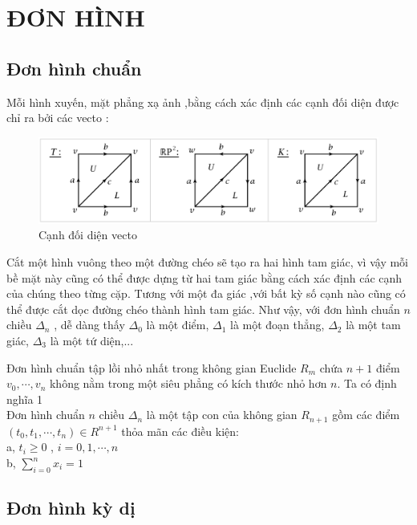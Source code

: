 \chapter{ĐƠN HÌNH}
\section{Đơn hình chuẩn}
\indent Mỗi hình xuyến, mặt phẳng xạ ảnh ,bằng cách xác định các cạnh đối diện được chỉ ra bởi các vecto :
\begin{figure}[h]  
\includegraphics[width=\textwidth]{figures/chap1_1}
\caption[Cạnh đối diện vecto]{Cạnh đối diện vecto
\label{fig:chap1_1}}
\end{figure}

\indent Cắt một hình vuông theo một đường chéo sẽ tạo ra hai hình tam giác, vì vậy mỗi bề mặt này cũng có thể được dựng từ hai tam giác bằng cách xác định các cạnh của chúng theo từng cặp. Tương với một đa giác ,với bất kỳ số cạnh nào cũng có thể được cắt dọc đường chéo thành  hình tam giác. Như vậy, với đơn hình chuẩn \(n\) chiều \(\Delta_n\) , dễ dàng thấy \(\Delta_0\) là một điểm, \(\Delta_1\) là một đoạn thẳng, \(\Delta_2\) là một tam giác, \(\Delta_3\) là một tứ diện,...

\indent Đơn hình chuẩn tập lồi nhỏ nhất trong không gian Euclide \(R_m\) chứa \(n + 1\) điểm  \(v_0,\cdots,v_n\) không nằm trong một siêu phẳng có kích thước nhỏ hơn \(n\).
\newpage
\indent Ta có định nghĩa 1 \\
\indent Đơn hình chuẩn \(n\) chiều \(\Delta_n\) là một tập con của không gian \(R_{n+1}\) gồm các điểm \((t_0, t_1,\cdots, t_n) \in R^{n+1}\) thỏa mãn các điều kiện: \\
\indent a, \(t_i \geq 0\) , \(i = 0,1,\cdots,n\) \\
\indent b, \(\sum_{i=0}^{n}x_i=1\)

\section{Đơn hình kỳ dị}
